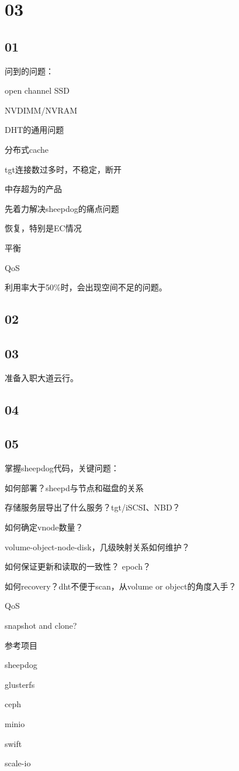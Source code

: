 \section{03}

\subsection{01}

问到的问题：
\begin{enumbox}
\item open channel SSD
\item NVDIMM/NVRAM
\item DHT的通用问题
\item 分布式cache
\item tgt连接数过多时，不稳定，断开
\item 中存超为的产品
\end{enumbox}

先着力解决sheepdog的痛点问题
\begin{enumbox}
\item 恢复，特别是EC情况
\item 平衡
\item QoS
\end{enumbox}

利用率大于50\%时，会出现空间不足的问题。

\subsection{02}

\subsection{03}

准备入职大道云行。

\subsection{04}

\subsection{05}

掌握sheepdog代码，关键问题：
\begin{enumbox}
\item 如何部署？sheepd与节点和磁盘的关系
\item 存储服务层导出了什么服务？tgt/iSCSI、NBD？
\item 如何确定vnode数量？
\item volume-object-node-disk，几级映射关系如何维护？
\item 如何保证更新和读取的一致性？ epoch？
\item 如何recovery？dht不便于scan，从volume or object的角度入手？
\item QoS
\item snapshot and clone?
\end{enumbox}

参考项目
\begin{enumbox}
\item sheepdog
\item glusterfs
\item ceph
\item minio
\item swift
\item scale-io
\end{enumbox}
